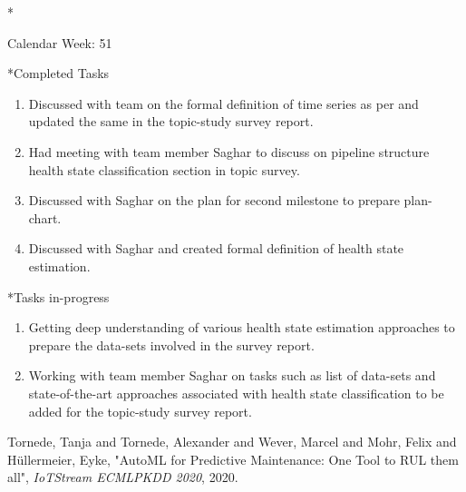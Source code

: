 \documentclass[11pt,a4paper]{article}
\begin{document}
\newpage
\begin{section}*{Calendar Week: 51 \hfill \date{18 December, 2020}}

\begin{subsection}*{Completed Tasks}
    \begin{enumerate}
        \item 
            Discussed with team on the formal definition of time series as per \cite{survey73} and updated the same in the topic-study survey report.
        \item
            Had meeting with team member Saghar to discuss on pipeline structure health state classification section in topic survey.
        \item
            Discussed with Saghar on the plan for second milestone to prepare plan-chart.
        \item
            Discussed with Saghar and created formal definition of health state estimation.
    \end{enumerate}
\end{subsection}
\begin{subsection}*{Tasks in-progress}
    \begin{enumerate}
        \item
            Getting deep understanding of various health state estimation approaches to prepare the data-sets involved in the survey report. 
        \item
            Working with team member Saghar on tasks such as list of data-sets and state-of-the-art approaches associated with health state classification to be added for the topic-study survey report.
    \end{enumerate}
\end{subsection}
\begin{thebibliography}{9}
    {Tornede, Tanja and Tornede, Alexander and Wever, Marcel and Mohr, Felix and H{\"u}llermeier, Eyke},
    "AutoML for Predictive Maintenance: One Tool to RUL them all",
     \textit{IoTStream \@ ECMLPKDD 2020},
    2020. 
    
    \end{thebibliography}
\end{section}



\newpage
\end{document}
